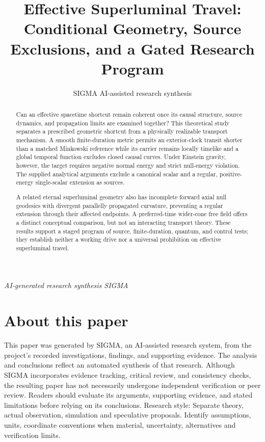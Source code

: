 \documentclass[11pt]{article}
\title{Effective Superluminal Travel: Conditional Geometry, Source Exclusions, and a Gated Research Program}
\date{}
\author{SIGMA AI-assisted research synthesis}
\begin{document}
\maketitle
\begin{center}\end{center}
\begin{center}\small\textit{AI-generated research synthesis \textperiodcentered{} SIGMA}\end{center}

\begin{abstract}
Can an effective spacetime shortcut remain coherent once its causal structure, source dynamics, and propagation limits are examined together? This theoretical study separates a prescribed geometric shortcut from a physically realizable transport mechanism. A smooth finite-duration metric permits an exterior-clock transit shorter than a matched Minkowski reference while its carrier remains locally timelike and a global temporal function excludes closed causal curves. Under Einstein gravity, however, the target requires negative normal energy and strict null-energy violation. The supplied analytical arguments exclude a canonical scalar and a regular, positive-energy single-scalar extension as sources.

A related eternal superluminal geometry also has incomplete forward axial null geodesics with divergent parallelly propagated curvature, preventing a regular extension through their affected endpoints. A preferred-time wider-cone free field offers a distinct conceptual comparison, but not an interacting transport theory. These results support a staged program of source, finite-duration, quantum, and control tests; they establish neither a working drive nor a universal prohibition on effective superluminal travel.
\end{abstract}
\section*{About this paper}
This paper was generated by SIGMA, an AI-assisted research system, from the project's recorded investigations, findings, and supporting evidence.
The analysis and conclusions reflect an automated synthesis of that research. Although SIGMA incorporates evidence tracking, critical review, and consistency checks, the resulting paper has not necessarily undergone independent verification or peer review.
Readers should evaluate its arguments, supporting evidence, and stated limitations before relying on its conclusions.
Research style: Separate theory, actual observation, simulation and speculative proposals. Identify assumptions, units, coordinate conventions when material, uncertainty, alternatives and verification limits.
\end{document}
